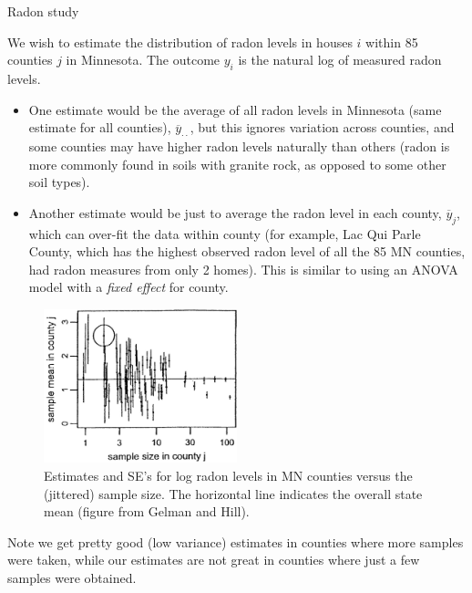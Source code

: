 \documentclass[ignorenonframetext,]{beamer}
\begin{document}
\begin{frame}{Radon study}

We wish to estimate the distribution of radon levels in houses \(i\)
within 85 counties \(j\) in Minnesota. The outcome \(y_i\) is the
natural log of measured radon levels.

\begin{itemize}
\item
  One estimate would be the average of all radon levels in Minnesota
  (same estimate for all counties), \(\overline{y}_{\cdot \cdot}\), but
  this ignores variation across counties, and some counties may have
  higher radon levels naturally than others (radon is more commonly
  found in soils with granite rock, as opposed to some other soil
  types).
\item
  Another estimate would be just to average the radon level in each
  county, \(\overline{y}_j\), which can over-fit the data within county
  (for example, Lac Qui Parle County, which has the highest observed
  radon level of all the 85 MN counties, had radon measures from only 2
  homes). This is similar to using an ANOVA model with a \emph{fixed
  effect} for county.
\end{itemize}

\end{frame}

\begin{frame}{}

\begin{figure}
\centering
\includegraphics[width=0.50000\textwidth]{figures/gelmannopool.jpg}
\caption{Estimates and SE's for log radon levels in MN counties versus
the (jittered) sample size. The horizontal line indicates the overall
state mean (figure from Gelman and Hill).}
\end{figure}

Note we get pretty good (low variance) estimates in counties where more
samples were taken, while our estimates are not great in counties where
just a few samples were obtained.

\end{frame}
\end{document}
